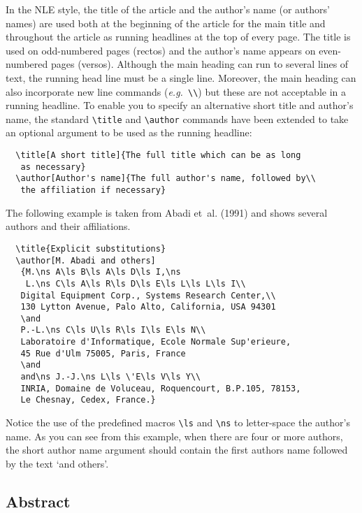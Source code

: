 \documentclass{nle}
\newcommand\eg{{\it e.g.\ }}
\begin{document}
In the NLE style, the title of the article and the author's name (or authors'
names) are used both at the beginning of the article for the main title and
throughout the article as running headlines at the top of every page.
The title is used on odd-numbered pages (rectos) and the author's name appears
on even-numbered pages (versos).
Although the main heading can run to several lines of text, the running head
line must be a single line.
Moreover, the main heading can also incorporate new line commands
(\eg \verb"\\") but these are not acceptable in a running headline.
To enable you to specify an alternative short title and author's name, the
standard \verb"\title" and \verb"\author" commands have been extended to take
an optional argument to be used as the running headline:
%
\begin{verbatim}
  \title[A short title]{The full title which can be as long
   as necessary}
  \author[Author's name]{The full author's name, followed by\\
   the affiliation if necessary}
\end{verbatim}
%
The following example is taken from Abadi et~al. (1991) and
shows several authors and their affiliations.
%
\begin{verbatim}
  \title{Explicit substitutions}
  \author[M. Abadi and others]
   {M.\ns A\ls B\ls A\ls D\ls I,\ns
    L.\ns C\ls A\ls R\ls D\ls E\ls L\ls L\ls I\\
   Digital Equipment Corp., Systems Research Center,\\
   130 Lytton Avenue, Palo Alto, California, USA 94301
   \and
   P.-L.\ns C\ls U\ls R\ls I\ls E\ls N\\
   Laboratoire d'Informatique, Ecole Normale Sup'erieure,
   45 Rue d'Ulm 75005, Paris, France
   \and
   and\ns J.-J.\ns L\ls \'E\ls V\ls Y\\
   INRIA, Domaine de Voluceau, Roquencourt, B.P.105, 78153,
   Le Chesnay, Cedex, France.}
\end{verbatim}
Notice the use of the predefined macros \verb"\ls" and \verb"\ns" to
letter-space the author's name. As you can see from this example, when
there are four or more authors, the short author name argument should
contain the first authors name followed by the text `and others'.

\subsection{Abstract}
\end{document}

